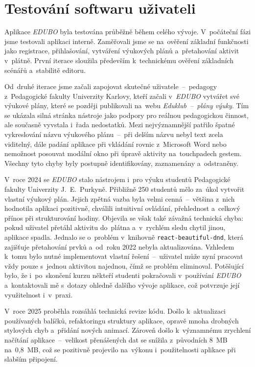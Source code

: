 \documentclass[male,czech,api_bc]{kitheses}
\begin{document}
\chapter{Testování softwaru uživateli}

Aplikace \textit{EDUBO} byla testována průběžně během celého vývoje. V~počáteční fázi jsme testovali aplikaci interně. Zaměřovali jsme se na~ověření základní funkčnosti jako registrace, přihlašování, vytváření výukových plánů a~přetahování aktivit v~plátně. První iterace sloužila především k~technickému ověření základních scénářů a~stabilitě editoru.

Od~druhé iterace jsme začali zapojovat skutečné uživatele~--~pedagogy z~Pedagogické fakulty Univerzity Karlovy, kteří začali v~\textit{EDUBO} vytvářet své výukové plány, které se později publikovali na~webu \textit{Eduklub~--~plány výuky}. Tím se ukázala silná stránka nástroje jako podpory pro reálnou pedagogickou činnost, ale současně vyvstala i~řada nedostatků. Mezi nejvýznamnější patřilo špatné vykreslování názvu výukového plánu~--~při delším názvu nebyl text zcela viditelný, dále padání aplikace při vkládání rovnic z~Microsoft Word nebo nemožnost posouvat modální okno při úpravě aktivity na~touchpadech gestem. Všechny tyto chyby byly postupně identifikovány, zaznamenány a~odstraněny.

V~roce 2024 se \textit{EDUBO} stalo nástrojem i~pro výuku studentů Pedagogické fakulty Univerzity J.~E.~Purkyně. Přibližně 250 studentů mělo za~úkol vytvořit vlastní výukový plán. Jejich zpětná vazba byla velmi cenná~--~většina z~nich hodnotila aplikaci pozitivně, chválili intuitivní ovládání, přehlednost a~celkový přínos při strukturování hodiny. Objevila se však také závažná technická chyba: pokud uživatel přetáhl aktivitu do~plátna a~v~rychlém sledu chytil jinou, aplikace spadla. Jednalo se o~problém v~knihovně \texttt{react-beautiful-dnd}, která zajišťuje přetahování prvků a~od~roku 2022 nebyla aktualizována. Vzhledem k~tomu bylo nutné implementovat vlastní řešení~--~uživatel může nyní pracovat vždy pouze s~jednou aktivitou najednou, čímž se problém eliminoval. Potěšující bylo, že i~po~skončení kurzu někteří studenti pokračovali v~používání \textit{EDUBO} a~kontaktovali mě s~dotazy ohledně dalšího vývoje aplikace, což potvrzuje její využitelnost i~v~praxi.

V~roce 2025 proběhla rozsáhlá technická revize kódu. Došlo k~aktualizaci používaných balíčků, refaktoringu struktury aplikace, opravě mnoha drobných stylových chyb a~přidání nových animací. Zároveň došlo k~významnému zrychlení načítání aplikace~--~velikost přenášených dat se snížila z~původních 8~MB na~0{,}8~MB, což se pozitivně projevilo na~výkonu i~použitelnosti aplikace při slabším připojení.
\end{document}
